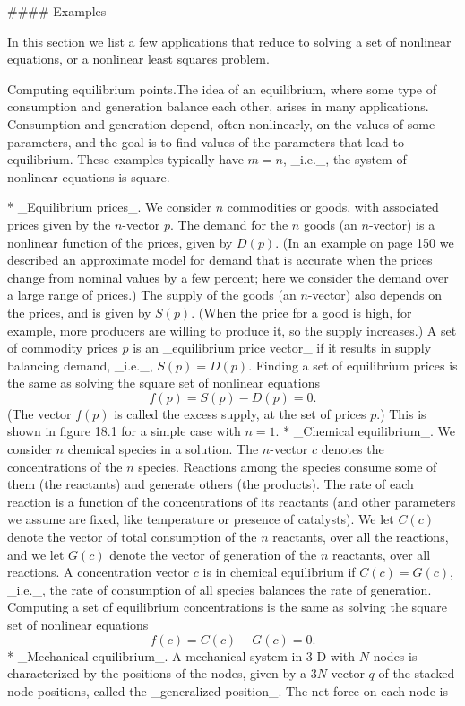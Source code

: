 

#### Examples

In this section we list a few applications that reduce to solving a set of nonlinear equations, or a nonlinear least squares problem.

Computing equilibrium points.The idea of an equilibrium, where some type of consumption and generation balance each other, arises in many applications. Consumption and generation depend, often nonlinearly, on the values of some parameters, and the goal is to find values of the parameters that lead to equilibrium. These examples typically have \(m=n\), _i.e._, the system of nonlinear equations is square.

* _Equilibrium prices_. We consider \(n\) commodities or goods, with associated prices given by the \(n\)-vector \(p\). The demand for the \(n\) goods (an \(n\)-vector) is a nonlinear function of the prices, given by \(D(p)\). (In an example on page 150 we described an approximate model for demand that is accurate when the prices change from nominal values by a few percent; here we consider the demand over a large range of prices.) The supply of the goods (an \(n\)-vector) also depends on the prices, and is given by \(S(p)\). (When the price for a good is high, for example, more producers are willing to produce it, so the supply increases.) A set of commodity prices \(p\) is an _equilibrium price vector_ if it results in supply balancing demand, _i.e._, \(S(p)=D(p)\). Finding a set of equilibrium prices is the same as solving the square set of nonlinear equations \[f(p)=S(p)-D(p)=0.\] (The vector \(f(p)\) is called the excess supply, at the set of prices \(p\).) This is shown in figure 18.1 for a simple case with \(n=1\).
* _Chemical equilibrium_. We consider \(n\) chemical species in a solution. The \(n\)-vector \(c\) denotes the concentrations of the \(n\) species. Reactions among the species consume some of them (the reactants) and generate others (the products). The rate of each reaction is a function of the concentrations of its reactants (and other parameters we assume are fixed, like temperature or presence of catalysts). We let \(C(c)\) denote the vector of total consumption of the \(n\) reactants, over all the reactions, and we let \(G(c)\) denote the vector of generation of the \(n\) reactants, over all reactions. A concentration vector \(c\) is in chemical equilibrium if \(C(c)=G(c)\), _i.e._, the rate of consumption of all species balances the rate of generation. Computing a set of equilibrium concentrations is the same as solving the square set of nonlinear equations \[f(c)=C(c)-G(c)=0.\]
* _Mechanical equilibrium_. A mechanical system in 3-D with \(N\) nodes is characterized by the positions of the nodes, given by a \(3N\)-vector \(q\) of the stacked node positions, called the _generalized position_. The net force on each node is